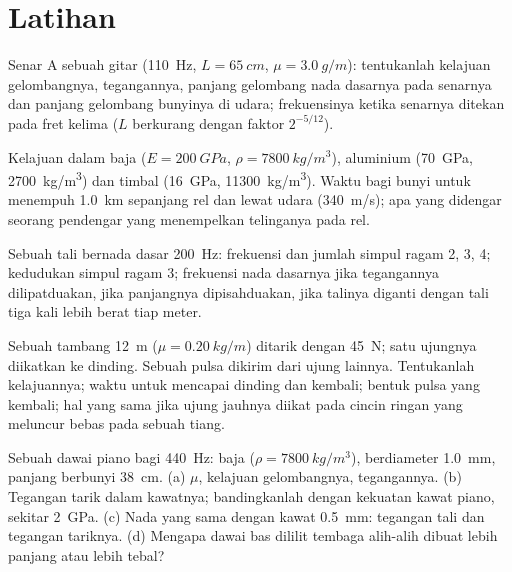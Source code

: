 \section{Latihan}

\begin{exercise}[$\star$]\label{exo:b2:waves-on-strings:1}
Senar A sebuah gitar (\qty{110}{Hz}, $L = \qty{65}{cm}$, $\mu = \qty{3.0}{g/m}$):
tentukanlah kelajuan gelombangnya, tegangannya, panjang gelombang nada dasarnya pada senarnya dan
panjang gelombang bunyinya di udara; frekuensinya ketika senarnya ditekan pada fret
kelima ($L$ berkurang dengan faktor $2^{-5/12}$).
\end{exercise}

\begin{exercise}[$\star$]\label{exo:b2:waves-on-strings:2}
Kelajuan  dalam baja ($E = \qty{200}{GPa}$, $\rho =
\qty{7800}{kg/m^3}$), aluminium (\qty{70}{GPa}, \qty{2700}{kg/m^3}) dan timbal
(\qty{16}{GPa}, \qty{11300}{kg/m^3}). Waktu bagi bunyi untuk menempuh \qty{1.0}{km}
sepanjang rel dan lewat udara (\qty{340}{m/s}); apa yang didengar seorang pendengar
yang menempelkan telinganya pada rel.
\end{exercise}

\begin{exercise}[$\star$]\label{exo:b2:waves-on-strings:3}
Sebuah tali bernada dasar \qty{200}{Hz}: frekuensi dan jumlah simpul
ragam 2, 3, 4; kedudukan simpul ragam 3; frekuensi
nada dasarnya jika tegangannya dilipatduakan, jika panjangnya dipisahduakan, jika
talinya diganti dengan tali tiga kali lebih berat tiap meter.
\end{exercise}

\begin{exercise}[$\star$]\label{exo:b2:waves-on-strings:4}
Sebuah tambang \qty{12}{m} ($\mu = \qty{0.20}{kg/m}$) ditarik dengan \qty{45}{N}; satu
ujungnya diikatkan ke dinding. Sebuah pulsa dikirim dari ujung lainnya. Tentukanlah kelajuannya;
waktu untuk mencapai dinding dan kembali; bentuk pulsa yang kembali;
hal yang sama jika ujung jauhnya diikat pada cincin ringan yang meluncur bebas pada
sebuah tiang.
\end{exercise}

\begin{exercise}[$\star\star$]\label{exo:b2:waves-on-strings:5}
Sebuah dawai piano bagi \qty{440}{Hz}: baja ($\rho = \qty{7800}{kg/m^3}$),
berdiameter \qty{1.0}{mm}, panjang berbunyi \qty{38}{cm}. (a) $\mu$, kelajuan gelombangnya,
tegangannya. (b) Tegangan tarik dalam kawatnya; bandingkanlah dengan kekuatan kawat
piano, sekitar \qty{2}{GPa}. (c) Nada yang sama dengan kawat \qty{0.5}{mm}: tegangan tali
dan tegangan tariknya. (d) Mengapa dawai bas dililit tembaga alih-alih dibuat
lebih panjang atau lebih tebal?
\end{exercise}

